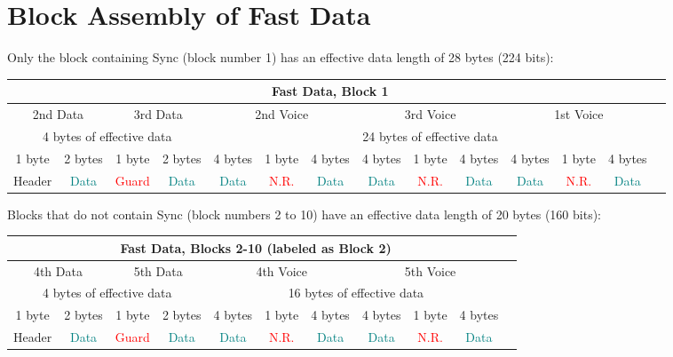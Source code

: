 \documentclass[10pt]{report}
\begin{document}
\section{Block Assembly of Fast Data}

Only the block containing Sync (block number 1) has an effective data
length of 28 bytes (224 bits):

\small{}
\begin{tabular}{|c|c|c|c|c|c|c|c|c|c|c|c|c|c|}
  \hline
  \multicolumn{13}{|c|}{\textbf{Fast Data, Block 1}} \\
  \hline
  \multicolumn{2}{|c|}{2nd Data} &
  \multicolumn{2}{|c|}{3rd Data} &
  \multicolumn{3}{|c|}{2nd Voice} &
  \multicolumn{3}{|c|}{3rd Voice} &
  \multicolumn{3}{|c|}{1st Voice} \\
  \hline
  \multicolumn{4}{|c|}{4 bytes of effective data} &
  \multicolumn{9}{|c|}{24 bytes of effective data} \\
  \hline
  1 byte & 2 bytes &
  1 byte & 2 bytes &
  4 bytes & 1 byte & 4 bytes &
  4 bytes & 1 byte & 4 bytes &
  4 bytes & 1 byte & 4 bytes \\
  \hline
  Header & \textcolor{teal}{Data} &
  \textcolor{red}{Guard} & \textcolor{teal}{Data} &
  \textcolor{teal}{Data} & \textcolor{red}{N.R.} & \textcolor{teal}{Data} &
  \textcolor{teal}{Data} & \textcolor{red}{N.R.} & \textcolor{teal}{Data} &
  \textcolor{teal}{Data} & \textcolor{red}{N.R.} & \textcolor{teal}{Data} \\
  \hline
\end{tabular}
\normalsize{}

Blocks that do not contain Sync (block numbers 2 to 10) have an
effective data length of 20 bytes (160 bits):

\small{}
\begin{tabular}{|c|c|c|c|c|c|c|c|c|c|c|}
  \hline
  \multicolumn{10}{|c|}{\textbf{Fast Data, Blocks 2-10 (labeled as Block 2)}} \\
  \hline
  \multicolumn{2}{|c|}{4th Data} &
  \multicolumn{2}{|c|}{5th Data} &
  \multicolumn{3}{|c|}{4th Voice} &
  \multicolumn{3}{|c|}{5th Voice} \\
  \hline
  \multicolumn{4}{|c|}{4 bytes of effective data} &
  \multicolumn{6}{|c|}{16 bytes of effective data} \\
  \hline
  1 byte & 2 bytes &
  1 byte & 2 bytes &
  4 bytes & 1 byte & 4 bytes &
  4 bytes & 1 byte & 4 bytes \\
  \hline
  Header & \textcolor{teal}{Data} &
  \textcolor{red}{Guard} & \textcolor{teal}{Data} &
  \textcolor{teal}{Data} & \textcolor{red}{N.R.} & \textcolor{teal}{Data} &
  \textcolor{teal}{Data} & \textcolor{red}{N.R.} & \textcolor{teal}{Data} \\
  \hline
\end{tabular}
\normalsize{}
\end{document}
